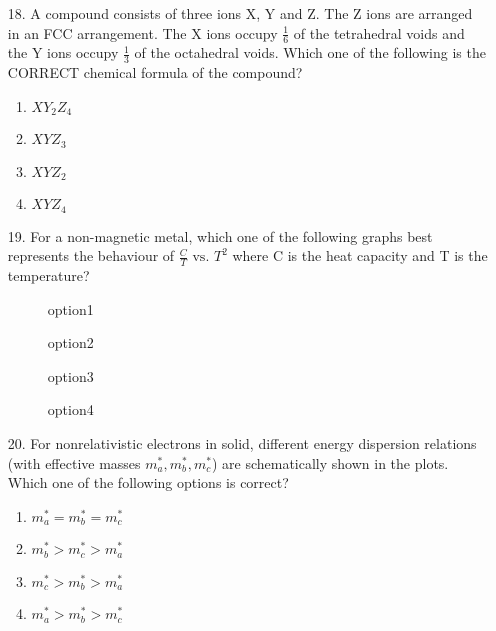 \documentclass[journal]{IEEEtran}
\begin{document}
\begin{enumerate}
    \item[18.] A compound consists of three ions X, Y and Z. The Z ions are arranged in an FCC
    arrangement. The X ions occupy $\frac{1}{6}$ of the tetrahedral voids and the Y ions occupy
    $\frac{1}{3}$ of the octahedral voids. Which one of the following is the CORRECT chemical
    formula of the compound? 
    \begin{enumerate}[label = (\Alph*)]
        \item $XY_2Z_4$
        \item $XYZ_3$
        \item $XYZ_2$
        \item $XYZ_4$
    \end{enumerate}
    \newpage
    \item[19.] For a non-magnetic metal, which one of the following graphs best represents the
    behaviour of $\frac{C}{T} \text{ vs. } T^2$ where C is the heat capacity and T is the temperature? 
    \begin{figure}[!ht]
        \centering
        \caption{option1}
    \end{figure}
    \begin{figure}[!ht]
        \centering
        \caption{option2}
    \end{figure}
    \begin{figure}[!ht]
        \centering
        \caption{option3}
    \end{figure}
    \begin{figure}[!ht]
        \centering
        \caption{option4}
    \end{figure}
    \newpage
    \item[20.] For nonrelativistic electrons in solid, different energy dispersion relations (with effective masses $m_a^*,m_b^*,m_c^*$) are schematically shown in the plots. Which one of the following options is correct?
    \begin{figure}[!ht]
        \centering
        \caption{}
    \end{figure}
    \begin{enumerate}[label = (\Alph*)]
        \item $m_a^*=m_b^*=m_c^*$
        \item $m_b^*>m_c^*>m_a^*$
        \item $m_c^*>m_b^*>m_a^*$
        \item $m_a^*>m_b^*>m_c^*$
    \end{enumerate}
   

\end{enumerate}
\end{document}

